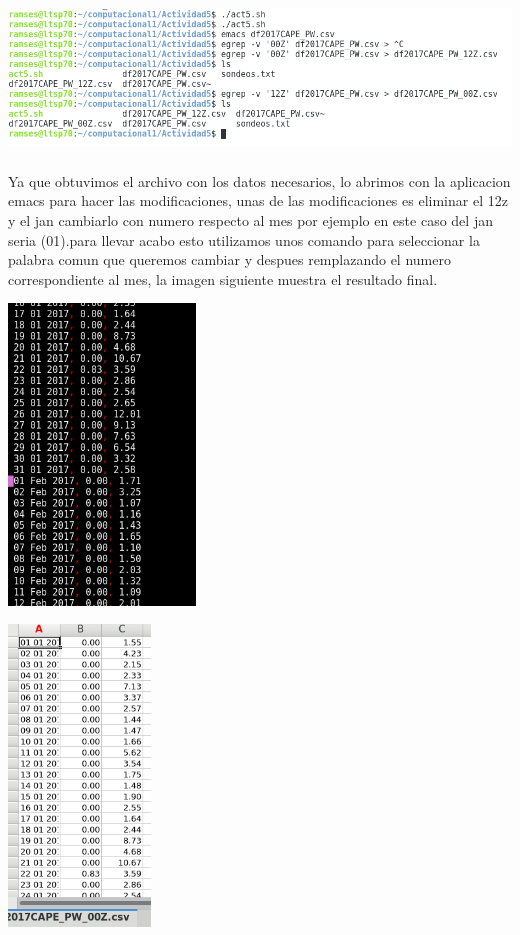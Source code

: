 \documentclass{article}
\begin{document}
\begin{itemize}
\begin{center}
\includegraphics[height=4cm]{act5_3.png}
\end{center}

\vspace{0.5mm}

Ya que obtuvimos el archivo con los datos necesarios, lo abrimos con la aplicacion emacs para hacer las modificaciones, unas de las modificaciones es eliminar el 12z y el jan cambiarlo con numero respecto al mes por ejemplo en este caso del jan seria (01).para llevar acabo esto utilizamos unos comando para seleccionar la palabra comun que queremos cambiar y despues remplazando el numero correspondiente al mes, la imagen siguiente muestra el resultado final.

\begin{center}
\includegraphics[height=8cm]{act5_2.png}
\end{center}


\begin{center}
\includegraphics[height=8cm]{act00z.png}
\end{center}


\end{itemize}
\end{document}
